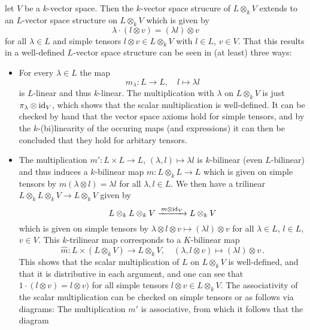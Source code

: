 \begin{fluff}
  let $V$ be a $k$-vector space.
  Then the $k$-vector space strucure of $L \otimes_k V$ extends to an $L$-vector space structure on $L \otimes_k V$ which is given by
  \[
      \lambda \cdot (l \otimes v)
    = (\lambda l) \otimes v
  \]
  for all $\lambda \in L$ and simple tensors $l \otimes v \in L \otimes_k V$ with $l \in L$, $v \in V$.
  That this results in a well-defined $L$-vector space structure can be seen in (at least) three ways:
  \begin{itemize}
    \item
      For every $\lambda \in L$ the map
      \[
                m_\lambda
        \colon  L
        \to     L,
        \quad   l
        \mapsto \lambda l
      \]
      is $L$-linear and thus $k$-linear.
      The multiplication with $\lambda$ on $L \otimes_k V$ is just $\pi_\lambda \otimes \operatorname{id}_V$, which shows that the scalar multiplication is well-defined.
      It can be checked by hand that the vector space axioms hold for simple tensors, and by the $k$-(bi)linearity of the occuring maps (and expressions) it can then be concluded that they hold for arbitary tensors.
    \item
      The multiplication $m' \colon L \times L \to L$, $(\lambda, l) \mapsto \lambda l$ is $k$-bilinear (even $L$-bilinear) and thus induces a $k$-bilinear map $m \colon L \otimes_k L \to L$ which is given on simple tensors by $m(\lambda \otimes l) = \lambda l$ for all $\lambda, l \in L$.
      We then have a trilinear $L \otimes_k L \otimes_k V \to L \otimes_k V$ given by
      \[
                                          L \otimes_k L \otimes_k V
        \xrightarrow{\,m \otimes \operatorname{id}_V\,} L \otimes_k V
      \]
      which is given on simple tensors by $\lambda \otimes l \otimes v \mapsto (\lambda l) \otimes v$ for all $\lambda \in L$, $l \in L$, $v \in V$.
      This $k$-trilinear map corresponds to a $K$-bilinear map
      \[
                \hat{m} 
        \colon  L \times (L \otimes_k V)
        \to     L \otimes_k V,
        \quad   (\lambda, l \otimes v)
        \mapsto (\lambda l) \otimes v \,.
      \]
      This shows that the scalar multiplication of $L$ on $L \otimes_k V$ is well-defined, and that it is distributive in each argument, and one can see that $1 \cdot (l \otimes v) = l \otimes v)$ for all simple tensors $l \otimes v \in L \otimes_k V$.
      The associativity of the scalar multiplication can be checked on simple tensors or as follows via diagrams:
      The multiplication $m'$ is associative, from which it follows that the diagram

\end{itemize}
\end{fluff}
